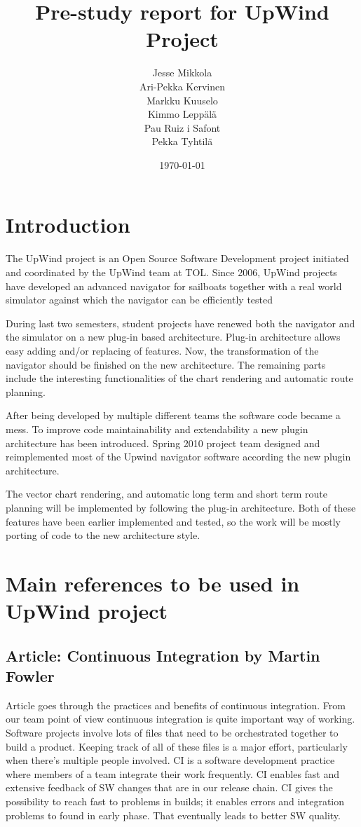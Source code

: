 \documentclass[12pt,titlepage]{report}
\date{\today}
\title{Pre-study report for UpWind Project}
\author{Jesse Mikkola\\
		Ari-Pekka Kervinen\\
		Markku Kuuselo\\
		Kimmo Leppälä\\
		Pau Ruiz i Safont\\
		Pekka Tyhtilä}
\begin{document}
\maketitle
\tableofcontents
\newpage

\section{Introduction}

	The UpWind project is an Open Source Software Development project initiated and coordinated by the UpWind team at TOL.
	Since 2006, UpWind projects have developed an advanced navigator for sailboats together with a real world simulator against which the navigator can be efficiently tested

	During last two semesters, student projects have renewed both the navigator and the simulator on a new plug-in based architecture.
	Plug-in architecture allows easy adding and/or replacing of features. Now, the transformation of the navigator should be finished on the new architecture.
	The remaining parts include the interesting functionalities of the chart rendering and automatic route planning.

	After being developed by multiple different teams the software code became a mess.
	To improve code maintainability and extendability a new plugin architecture has been introduced.
	Spring 2010 project team designed and reimplemented most of the Upwind navigator software according the new plugin architecture.

	The vector chart rendering, and automatic long term and short term route planning will be implemented by following the plug-in architecture.
	Both of these features have been earlier implemented and tested, so the work will be mostly porting of code to the new architecture style.

\section{Main references to be used in UpWind project}

\subsection{Article: Continuous Integration by Martin Fowler}

Article goes through the practices and benefits of continuous integration.
From our team point of view continuous integration is quite important way of working.
Software projects involve lots of files that need to be orchestrated together to build a product.
Keeping track of all of these files is a major effort, particularly when there's multiple people involved.
CI is a software development practice where members of a team integrate their work frequently.
CI enables fast and extensive feedback of SW changes that are in our release chain.
CI gives the possibility to reach fast to problems in builds; it enables errors and integration problems to found in early phase.
That eventually leads to better SW quality.
\end{document}

